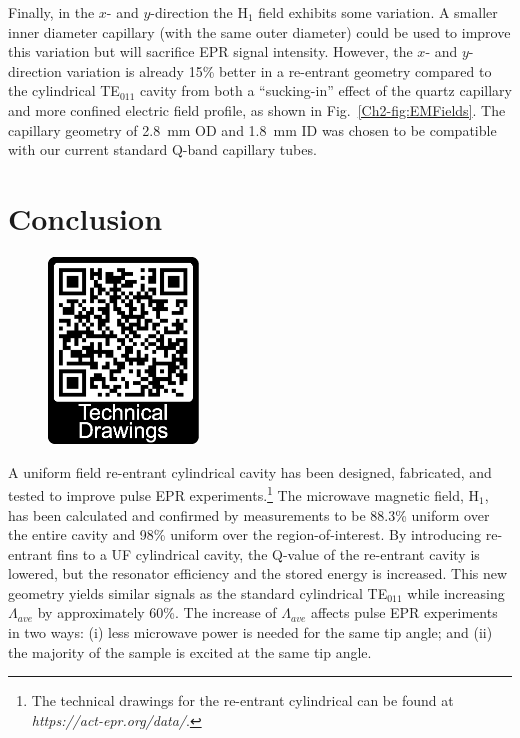 Finally, in the $x$- and $y$-direction the H$_1$ field exhibits some variation. A smaller inner diameter capillary (with the same outer diameter) could be used to improve this variation but will sacrifice EPR signal intensity. However, the $x$- and $y$-direction variation is already 15\% better in a re-entrant geometry compared to the cylindrical TE$_{011}$ cavity from both a ``sucking-in'' effect of the quartz capillary and more confined electric field profile, as shown in Fig.~\ref{Ch2-fig:EMFields}. The capillary geometry of 2.8~mm OD and 1.8~mm ID was chosen to be compatible with our current standard Q-band capillary tubes. 

\section{Conclusion}
\begin{figure}
\centering
\includegraphics[width=4cm]{Kapitel/Appendix/ActEPRdataQR.eps}
\end{figure}

A uniform field re-entrant cylindrical \cylTE{} cavity has been designed, fabricated, and tested to improve pulse EPR experiments.\footnote{The technical drawings for the re-entrant cylindrical \cylTE{} can be found at \textit{https://act-epr.org/data/}.} The microwave magnetic field, H$_1$, has been calculated and confirmed by measurements to be 88.3\% uniform over the entire cavity and 98\% uniform over the region-of-interest. By introducing re-entrant fins to a UF cylindrical \cylTE{} cavity, the Q-value of the re-entrant \cylTE{} cavity is lowered, but the resonator efficiency and the stored energy is increased. This new geometry yields similar signals as the standard cylindrical TE$_{011}$ while increasing $\Lambda_{ave}$ by approximately 60\%. The increase of $\Lambda_{ave}$ affects pulse EPR experiments in two ways: (i) less microwave power is needed for the same tip angle; and (ii) the majority of the sample is excited at the same tip angle. 


